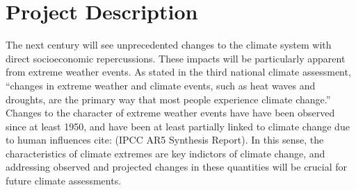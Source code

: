 \documentclass[11pt]{article}
\begin{document}
\appendix

\addtocounter{section}{3}

 
\section{Project Description}

The next century will see unprecedented changes to the climate system with direct socioeconomic repercussions.  These impacts will be particularly apparent from extreme weather events. As stated in the third national climate assessment, ``changes in extreme weather and climate events, such as heat waves and droughts, are the primary way that most people experience climate change.''  Changes to the character of extreme weather events have have been observed since at least 1950, and have been at least partially linked to climate change due to human influences {\color{red}cite: (IPCC AR5 Synthesis Report)}.  In this sense, the characteristics of climate extremes are key indictors of climate change, and addressing observed and projected changes in these quantities will be crucial for future climate assessments.
\end{document}
